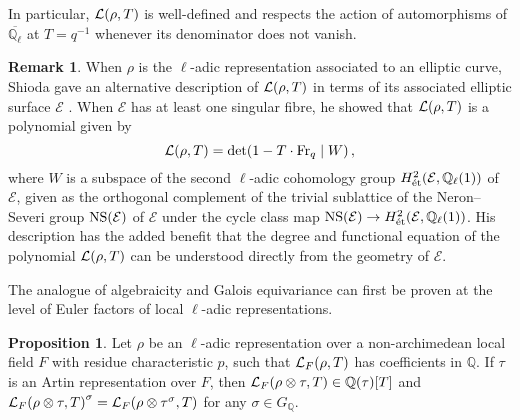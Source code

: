 \documentclass{article}
\theoremstyle{definition}
\newtheorem{proposition}[n]{Proposition}
\theoremstyle{definition}
\newtheorem{remark}[n]{Remark}
\newcommand{\EEE}{\mathcal{E}}
\newcommand{\et}{\text{\'et}}
\newcommand{\Fr}{\mathrm{Fr}}
\newcommand{\LLL}{\mathcal{L}}
\newcommand{\NS}{\mathrm{NS}}
\newcommand{\QQ}{\mathbb{Q}}
\newcommand{\br}{\!\del[0]}
\begin{document}
In particular, $ \LLL\br{\rho, T} $ is well-defined and respects the action of automorphisms of $ \overline{\QQ_\ell} $ at $ T = q^{-1} $ whenever its denominator does not vanish.

\begin{remark}
When $ \rho $ is the $ \ell $-adic representation associated to an elliptic curve, Shioda gave an alternative description of $ \LLL\br{\rho, T} $ in terms of its associated elliptic surface $ \EEE $ \cite[Theorem 4]{Shi92}. When $ \EEE $ has at least one singular fibre, he showed that $ \LLL\br{\rho, T} $ is a polynomial given by
$$ \LLL\br{\rho, T} = \det\br{1 - T \cdot \Fr_q \mid W}, $$
where $ W $ is a subspace of the second $ \ell $-adic cohomology group $ H_\et^2\br{\EEE, \QQ_\ell\br{1}} $ of $ \EEE $, given as the orthogonal complement of the trivial sublattice of the Neron--Severi group $ \NS\br{\EEE} $ of $ \EEE $ under the cycle class map $ \NS\br{\EEE} \to H_\et^2\br{\EEE, \QQ_\ell\br{1}} $. His description has the added benefit that the degree and functional equation of the polynomial $ \LLL\br{\rho, T} $ can be understood directly from the geometry of $ \EEE $.
\end{remark}

The analogue of algebraicity and Galois equivariance can first be proven at the level of Euler factors of local $ \ell $-adic representations.

\begin{proposition}
\label{prop:local}
Let $ \rho $ be an $ \ell $-adic representation over a non-archimedean local field $ F $ with residue characteristic $ p $, such that $ \LLL_F\br{\rho, T} $ has coefficients in $ \QQ $. If $ \tau $ is an Artin representation over $ F $, then $ \LLL_F\br{\rho \otimes \tau, T} \in \QQ\br{\tau}\sbr{T} $ and $ \LLL_F\br{\rho \otimes \tau, T}^\sigma = \LLL_F\br{\rho \otimes \tau^\sigma, T} $ for any $ \sigma \in G_\QQ $.
\end{proposition}
\end{document}
